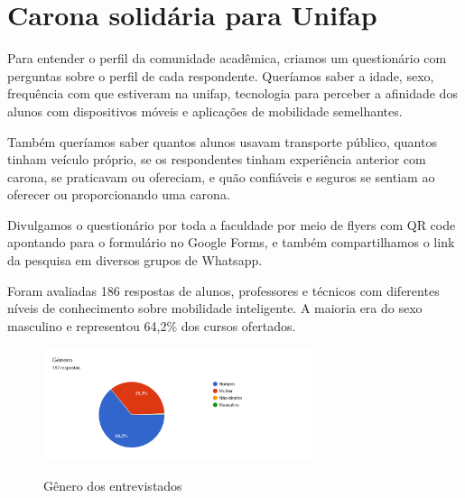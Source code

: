 %
%


\chapter{Carona solidária para Unifap}\label{chap:Carona solidária para Unifap}  

Para entender o perfil da comunidade acadêmica, criamos um questionário com perguntas sobre o perfil de cada respondente. Queríamos saber a idade, sexo, frequência com que estiveram na unifap, tecnologia para perceber a afinidade dos alunos com dispositivos móveis e aplicações de mobilidade semelhantes.

Também queríamos saber quantos alunos usavam transporte público, quantos tinham veículo próprio, se os respondentes tinham experiência anterior com carona, se praticavam ou ofereciam, e quão confiáveis e seguros se sentiam ao oferecer ou proporcionando uma carona.

Divulgamos o questionário por toda a faculdade por meio de flyers com QR code apontando para o formulário no Google Forms, e também compartilhamos o link da pesquisa em diversos grupos de Whatsapp.

Foram avaliadas 186 respostas de alunos, professores e técnicos com diferentes níveis de conhecimento sobre mobilidade inteligente. A maioria era do sexo masculino e representou 64,2\% dos cursos ofertados.

\begin{figure}[H]
	\centering
	\caption{Gênero dos entrevistados}
	\includegraphics[width=0.7\textwidth]{./04-figuras/questionario/2.png}
	\label{fig:genero}
\end{figure}

